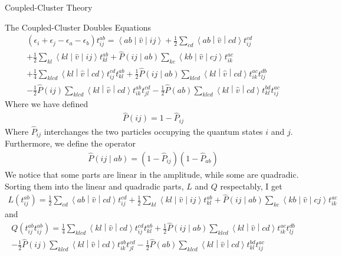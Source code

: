 \documentclass[twoside,english]{uiofysmaster}
\begin{document}
\begin{chapter}{Coupled-Cluster Theory}
\begin{section}{The Coupled-Cluster Doubles Equations}
  		\begin{align}
  			(\epsilon_i + \epsilon_j - \epsilon_a - \epsilon_b) t_{ij}^{ab} = \left<ab\middle|\hat v\middle|ij\right> + \frac{1}{2} \sum_{cd}\left<ab\middle|\hat v\middle|cd\right>t_{ij}^{cd} \\
  			+ \frac{1}{2} \sum_{kl} \left<kl\middle|\hat v\middle|ij\right>t_{kl}^{ab} + \hat P\left(ij\middle|ab\right) \sum_{kc}\left<kb\middle|\hat v\middle|cj\right>t_{ik}^{ac} \\
  			+ \frac{1}{4} \sum_{klcd}\left<kl\middle|\hat v\middle|cd\right>t_{ij}^{cd} t_{kl}^{ab} + \frac{1}{2} \hat P\left(ij\middle|ab\right) \sum_{klcd}\left<kl\middle|\hat v\middle|cd\right>t_{ik}^{ac} t_{lj}^{db}\\
  			- \frac{1}{2}\hat P(ij) \sum_{klcd}\left<kl\middle|\hat v\middle|cd\right>t_{ik}^{ab} t_{jl}^{cd} - \frac{1}{2}\hat P(ab) \sum_{klcd}\left<kl\middle|\hat v\middle|cd\right>t_{kl}^{bd} t_{ij}^{ac}
  			\label{CCD_equations1}
  		\end{align}
  		Where we have defined
  		\begin{align}
  			\hat P(ij) = 1 - \hat P_{ij}
  		\end{align}
  		Where $\hat P_{ij}$ interchanges the two particles occupying the quantum states $i$ and $j$. Furthermore, we define the operator 
  		\begin{align}
  			\hat P\left( ij \middle| ab \right) = (1 - \hat P_{ij}) (1 - \hat P_{ab})
  		\end{align}
  		We notice that some parts are linear in the amplitude, while some are quadradic. Sorting them into the linear and quadradic parts, $L$ and $Q$ respectably, I get
  		\begin{align}
  			L(t_{ij}^{ab}) = \frac{1}{2} \sum_{cd}\left<ab\middle|\hat v\middle|cd\right>t_{ij}^{cd} + \frac{1}{2} \sum_{kl} \left<kl\middle|\hat v\middle|ij\right>t_{kl}^{ab} + \hat P\left(ij\middle|ab\right) \sum_{kc}\left<kb\middle|\hat v\middle|cj\right>t_{ik}^{ac}
  		\end{align}
  		and 
  		\begin{align}
  			Q(t_{ij}^{ab}t_{ij}^{ab}) = \frac{1}{4} \sum_{klcd}\left<kl\middle|\hat v\middle|cd\right>t_{ij}^{cd} t_{kl}^{ab} + \frac{1}{2} \hat P\left(ij\middle|ab\right) \sum_{klcd}\left<kl\middle|\hat v\middle|cd\right>t_{ik}^{ac} t_{lj}^{db} \\
  			- \frac{1}{2}\hat P(ij) \sum_{klcd}\left<kl\middle|\hat v\middle|cd\right>t_{ik}^{ab} t_{jl}^{cd} - \frac{1}{2}\hat P(ab) \sum_{klcd}\left<kl\middle|\hat v\middle|cd\right>t_{kl}^{bd} t_{ij}^{ac}

\end{align}
\end{section}
\end{chapter}
\end{document}
